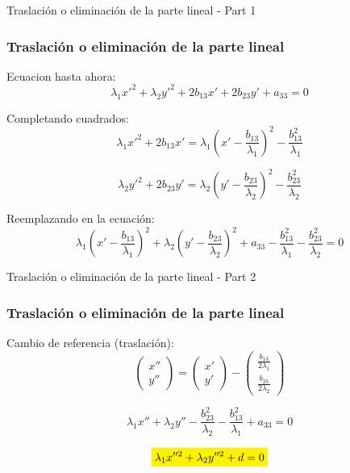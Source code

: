\documentclass[xcolor={dvipsnames},aspectratio=169,10pt]{beamer}
\begin{document}
\begin{frame}{Traslación o eliminación de la parte lineal - Part 1}
  \frametitle{Traslación o eliminación de la parte lineal}
  Ecuacion hasta ahora:
  \begin{equation*}
    \boxed{\lambda_1x'^2 + \lambda_2y'^2 + 2b_{13}x' + 2b_{23}y' + a_{33} = 0}
  \end{equation*}

  Completando cuadrados:
  \begin{equation*}
    \lambda_{1}x'^2 + 2b_{13}x' = \lambda_{1}\left(x' - \frac{b_{13}}{\lambda_{1}}\right)^2 - \frac{b_{13}^2}{\lambda_{1}}
  \end{equation*}
  
  \begin{equation*}
    \lambda_{2}y'^2 + 2b_{23}y' = \lambda_{2}\left(y' - \frac{b_{23}}{\lambda_{2}}\right)^2 - \frac{b_{23}^2}{\lambda_{2}}
  \end{equation*}

  Reemplazando en la ecuación:
  \begin{equation*}
    \boxed{\lambda_{1}\left(x' - \frac{b_{13}}{\lambda_{1}}\right)^2 + \lambda_{2}\left(y' - \frac{b_{23}}{\lambda_{2}}\right)^2 + a_{33} - \frac{b_{13}^2}{\lambda_{1}} - \frac{b_{23}^2}{\lambda_{2}} = 0}
  \end{equation*}

\end{frame}

\begin{frame}{Traslación o eliminación de la parte lineal - Part 2}
  \frametitle{Traslación o eliminación de la parte lineal}

  Cambio de referencia (traslación):
  \begin{equation*}
    \begin{pmatrix} x'' \\ y'' \end{pmatrix} = \begin{pmatrix} x' \\ y' \end{pmatrix} - \begin{pmatrix} \frac{b_{13}}{2\lambda_{1}} \\ \frac{b_{23}}{2\lambda_{2}} \end{pmatrix}
  \end{equation*}

  \begin{equation*}
    \lambda_{1}x''+ \lambda_{2}y'' - \frac{b_{23}^2}{\lambda_{2}}  - \frac{b_{13}^2}{\lambda_{1}}  + a_{33} = 0
  \end{equation*}

  \begin{equation*}
    \colorbox{yellow}{$\displaystyle\lambda_{1}x''^2 + \lambda_{2}y''^2 + d = 0$}
  \end{equation*}
\end{frame}
\end{document}
